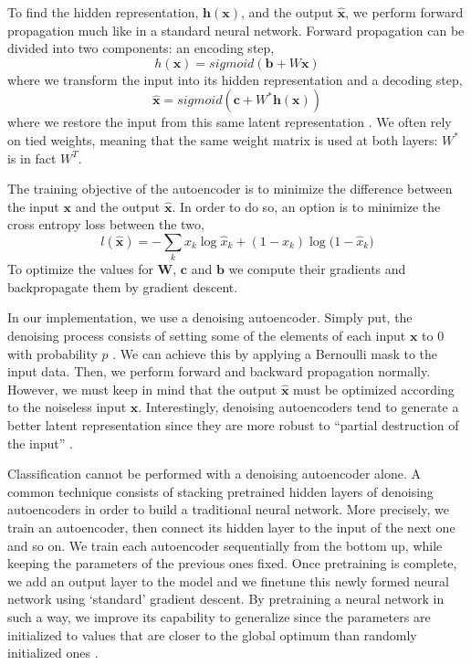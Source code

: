 \documentclass{acm_proc_article-sp}
\begin{document}
To find the hidden representation, $\mathbf{h}(\mathbf{x})$, and the output $\mathbf{\hat{x}}$, we perform forward propagation much like in a standard neural network. Forward propagation can be divided into two components: an encoding step,
$$h(\mathbf{x}) = sigmoid(\mathbf{b} + W\mathbf{x} ) $$
where we transform the input into its hidden representation and a decoding step,
$$\mathbf{\hat{x}} = sigmoid(\mathbf{c} + W^*\mathbf{h}(\mathbf{x}) ) $$
where we restore the input from this same latent representation \cite{larochelle}. We often rely on tied weights, meaning that the same weight matrix is used at both layers: $W^*$ is in fact $W^T$.

The training objective of the autoencoder is to minimize the difference between the input $\mathbf{x}$ and the output $\mathbf{\hat{x}}$. In order to do so, an option is to minimize the cross entropy loss between the two,
$$l(\mathbf{\hat{x}}) = -\sum_k{x_k \log{\hat{x}_k} + (1-x_k)\log{(1-\hat{x}_k})} $$
To optimize the values for $\mathbf{W}$, $\mathbf{c}$ and $\mathbf{ b}$ we compute their gradients and backpropagate them by gradient descent.

In our implementation, we use a denoising autoencoder. Simply put, the denoising process consists of setting some of the elements of each input $\mathbf{x}$ to $0$ with probability $p$  \cite{vincent2008}. We can achieve this by applying a Bernoulli mask to the input data. Then, we perform forward and backward propagation normally. However, we must keep in mind that the output $\mathbf{\hat{x}}$ must be optimized according to the noiseless input $\mathbf{x}$. Interestingly, denoising autoencoders tend to generate a better latent representation since they are more robust to ``partial destruction of the input'' \cite{vincent2008}. 

Classification cannot be performed with a denoising autoencoder alone. A common technique consists of stacking pretrained hidden layers of denoising autoencoders in order to build a traditional neural network. More precisely, we train an autoencoder, then connect its hidden layer to the input of the next one and so on. We train each autoencoder sequentially from the bottom up, while keeping the parameters of the previous ones fixed. Once pretraining is complete, we add an output layer to the model and we finetune this newly formed neural network using `standard' gradient descent. By pretraining a neural network in such a way, we improve its capability to generalize since the parameters are initialized to values that are closer to the global optimum than randomly initialized ones \cite{vincent2010}. 
\end{document}
